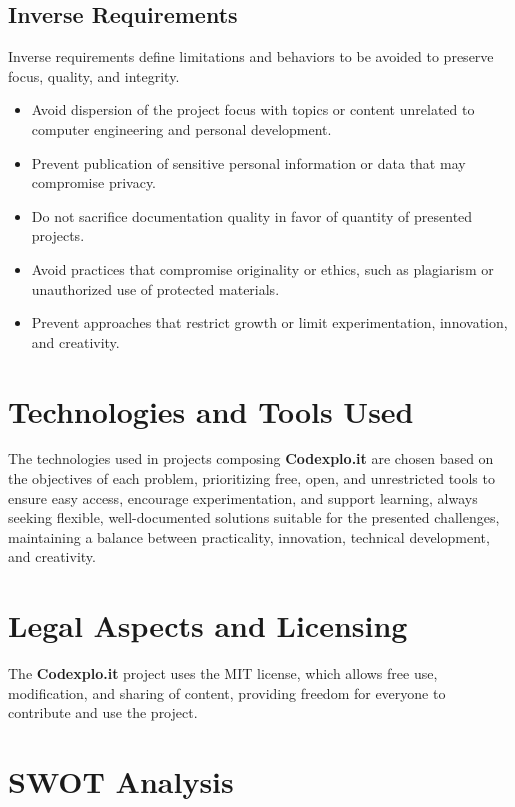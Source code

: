 \documentclass[10pt, a4paper, oneside]{article}
\begin{document}
\subsection{Inverse Requirements}

Inverse requirements define limitations and behaviors to be avoided to preserve focus, quality, and integrity.

\begin{itemize}
    \item Avoid dispersion of the project focus with topics or content unrelated to computer engineering and personal development.
    \item Prevent publication of sensitive personal information or data that may compromise privacy.
    \item Do not sacrifice documentation quality in favor of quantity of presented projects.
    \item Avoid practices that compromise originality or ethics, such as plagiarism or unauthorized use of protected materials.
    \item Prevent approaches that restrict growth or limit experimentation, innovation, and creativity.
\end{itemize}

\section{Technologies and Tools Used}

The technologies used in projects composing \textbf{Codexplo.it} are chosen based on the objectives of each problem, prioritizing free, open, and unrestricted tools to ensure easy access, encourage experimentation, and support learning, always seeking flexible, well-documented solutions suitable for the presented challenges, maintaining a balance between practicality, innovation, technical development, and creativity.

\section{Legal Aspects and Licensing}

The \textbf{Codexplo.it} project uses the MIT license, which allows free use, modification, and sharing of content, providing freedom for everyone to contribute and use the project.

\section{SWOT Analysis}
\end{document}

